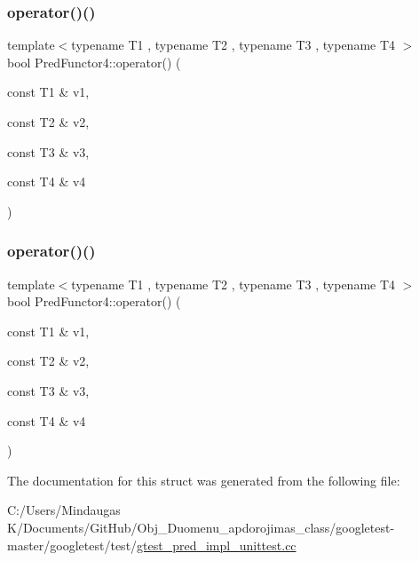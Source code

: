 \mbox{\label{struct_pred_functor4_a6cfb6ccd9a66bf93d9c43a49575e3869}} 
\subsubsection{\texorpdfstring{operator()()}{operator()()}\hspace{0.1cm}{\footnotesize\ttfamily [2/3]}}
{\footnotesize\ttfamily template$<$typename T1 , typename T2 , typename T3 , typename T4 $>$ \\
bool Pred\+Functor4\+::operator() (\begin{DoxyParamCaption}\item[{const T1 \&}]{v1,  }\item[{const T2 \&}]{v2,  }\item[{const T3 \&}]{v3,  }\item[{const T4 \&}]{v4 }\end{DoxyParamCaption})\hspace{0.3cm}{\ttfamily [inline]}}

\mbox{\label{struct_pred_functor4_a6cfb6ccd9a66bf93d9c43a49575e3869}} 
\subsubsection{\texorpdfstring{operator()()}{operator()()}\hspace{0.1cm}{\footnotesize\ttfamily [3/3]}}
{\footnotesize\ttfamily template$<$typename T1 , typename T2 , typename T3 , typename T4 $>$ \\
bool Pred\+Functor4\+::operator() (\begin{DoxyParamCaption}\item[{const T1 \&}]{v1,  }\item[{const T2 \&}]{v2,  }\item[{const T3 \&}]{v3,  }\item[{const T4 \&}]{v4 }\end{DoxyParamCaption})\hspace{0.3cm}{\ttfamily [inline]}}



The documentation for this struct was generated from the following file\+:\begin{DoxyCompactItemize}
\item 
C\+:/\+Users/\+Mindaugas K/\+Documents/\+Git\+Hub/\+Obj\+\_\+\+Duomenu\+\_\+apdorojimas\+\_\+class/googletest-\/master/googletest/test/\mbox{\hyperlink{googletest-master_2googletest_2test_2gtest__pred__impl__unittest_8cc}{gtest\+\_\+pred\+\_\+impl\+\_\+unittest.\+cc}}\end{DoxyCompactItemize}
